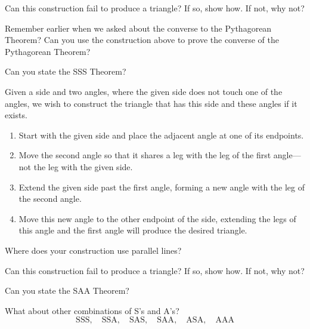 \begin{question} 
Can this construction fail to produce a triangle? If so, show how. If
not, why not?
\end{question}
\QM

\begin{question}
Remember earlier when we asked about the converse to the Pythagorean
Theorem? Can you use the construction above
to prove the converse of the Pythagorean Theorem?
\end{question}
\QM

\begin{question}
Can you state the SSS Theorem?
\end{question}
\QM

\begin{construction} 
Given a side and two angles, where the given side does not touch one
of the angles, we wish to construct the triangle that has this side
and these angles if it exists.
\begin{enumerate}
\item Start with the given side and place the adjacent angle at one of
  its endpoints.
\item Move the second angle so that it shares a leg with the leg of
  the first angle---not the leg with the given side.
\item Extend the given side past the first angle, forming a new angle with
  the leg of the second angle.
\item Move this new angle to the other endpoint of the side, extending
  the legs of this angle and the first angle will produce the desired
  triangle.
\end{enumerate}
\end{construction}

\begin{question} 
Where does your construction use parallel lines?  
\end{question}
\QM

\begin{question} 
Can this construction fail to produce a triangle? If so, show how. If
not, why not?
\end{question}
\QM

\begin{question}
Can you state the SAA Theorem?
\end{question}
\QM

\begin{question} What about other combinations of S's and A's?
\[
\text{SSS},\quad \text{SSA},\quad \text{SAS},\quad \text{SAA},\quad \text{ASA},\quad \text{AAA} 
\]
\end{question}
\QM

